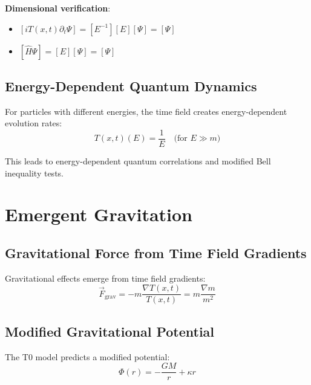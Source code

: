 \documentclass[twocolumn,aps,prl]{revtex4-2}
\newcommand{\Tfieldt}{T(x,t)}
\begin{document}
	\textbf{Dimensional verification}:
	\begin{itemize}
		\item \([i \Tfieldt \partial_t \Psi] = [E^{-1}][E][\Psi] = [\Psi]\)
		\item \([\hat{H} \Psi] = [E][\Psi] = [\Psi]\) \checkmark
	\end{itemize}
	
	\subsection{Energy-Dependent Quantum Dynamics}
	\label{subsec:energy_dependent_dynamics}
	
	For particles with different energies, the time field creates energy-dependent evolution rates:
	\begin{equation}
		\Tfieldt(E) = \frac{1}{E} \quad \text{(for } E \gg m\text{)}
		\label{eq:energy_dependent_time}
	\end{equation}
	
	This leads to energy-dependent quantum correlations and modified Bell inequality tests.
	
	\section{Emergent Gravitation}
	\label{sec:emergent_gravitation}
	
	\subsection{Gravitational Force from Time Field Gradients}
	\label{subsec:gravitational_force}
	
	Gravitational effects emerge from time field gradients:
	\begin{equation}
		\vec{F}_{\text{grav}} = -m \frac{\nabla \Tfieldt}{\Tfieldt} = m \frac{\nabla m}{m^2}
		\label{eq:gravitational_force}
	\end{equation}
	
	\subsection{Modified Gravitational Potential}
	\label{subsec:modified_potential}
	
	The T0 model predicts a modified potential:
	\begin{equation}
		\Phi(r) = -\frac{GM}{r} + \kappa r
		\label{eq:modified_gravitational_potential}
	\end{equation}
	
\end{document}
